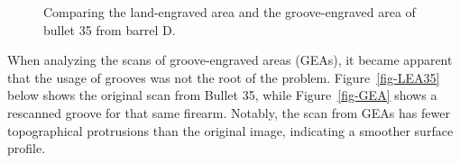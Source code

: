 \documentclass[
  12pt]{article}
\begin{document}
\begin{figure}

\begin{minipage}{0.50\linewidth}



\end{minipage}%
%
\begin{minipage}{0.50\linewidth}



\end{minipage}%

\caption{\label{fig-bulletScans}Comparing the land-engraved area and the
groove-engraved area of bullet 35 from barrel D.}

\end{figure}%

When analyzing the scans of groove-engraved areas (GEAs), it became
apparent that the usage of grooves was not the root of the problem.
Figure~\ref{fig-LEA35} below shows the original scan from Bullet 35,
while Figure~\ref{fig-GEA} shows a rescanned groove for that same
firearm. Notably, the scan from GEAs has fewer topographical protrusions
than the original image, indicating a smoother surface profile.
\end{document}
